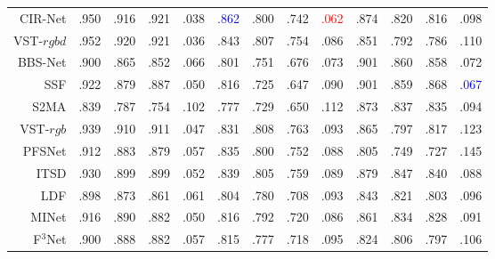 \begin{table}[!ht]
{\begin{tabular}{rcccccccccccc}
			CIR-Net \upcite{cong2022cir}
			& .950 & .916 & .921 & .038 
			& \textcolor{blue}{.862} & .800 & .742 & \textcolor{red}{.062}
			& .874 & .820 & .816 & .098 \\ 
			
			VST-$rgbd$  \upcite{liu2021visual} 
			& .952 & .920 & .921 & .036 
			& .843 & .807 & .754 & .086 
			& .851 & .792 & .786 & .110 
			\\
			
			
			BBS-Net     \upcite{fan2020bbs} 
			& .900 & .865 & .852 & .066 
			& .801 & .751 & .676 & .073 
			& .901 & .860 & .858 & .072 \\ 
			
			SSF     \upcite{zhang2020select} 
			& .922 & .879 & .887 & .050 
			& .816 & .725 & .647 & .090 
			& .901 & .859 & .868 & \textcolor{blue}{.067} \\ 
			
			S2MA    \upcite{liu2020learning} 
			& .839 & .787 & .754 & 	.102 
			& .777 & .729 & .650 & .112 
			& .873 & .837 &	.835 & .094 \\
			
			
			\midrule %
			
			VST-$rgb$ \upcite{liu2021visual} 
			& .939 & .910 & .911 & .047
			& .831 & .808 & .763 & .093 
			& .865 & .797 & .817 & .123 
			\\ 
			
			PFSNet \upcite{ma2021pyramidal}
			& .912 & .883 & .879 & .057 
			& .835 & .800 & .752 & .088 
			& .805 & .749 & .727 & .145 
			\\ 
			
			
			ITSD \upcite{zhou2020interactive} 
			& .930 & .899 & .899 & .052 
			& .839 & .805 & .759 & .089 
			& .879 & .847 & .840 & .088 
			\\ 
			
			
			
			LDF \upcite{wei2020label} 
			& .898 & .873 & .861 & .061 
			& .804 & .780 & .708 & .093 
			& .843 & .821 & .803 & .096 
			\\ 
			
			
			MINet \upcite{pang2020multi} 
			& .916 & .890 & .882 & .050 
			& .816 & .792 & .720 & .086 
			& .861 & .834 & .828 & .091 
			\\ 
			
			F$^{3}$Net  \upcite{wei2020f3net}
			& .900 & .888 & .882 & .057 
			& .815 & .777 & .718 & .095 
			& .824 & .806 & .797 & .106 
			\\ 
			

\end{tabular}}
\end{table}
